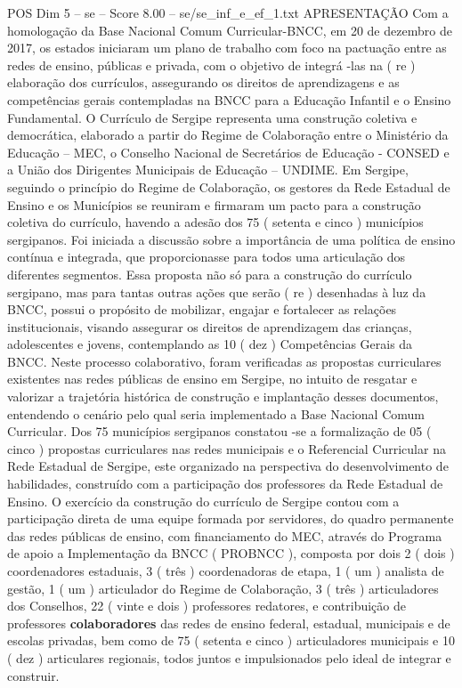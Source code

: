 \begin{textsample}{POS Dim 5 – se – Score 8.00 – se/se\_inf\_e\_ef\_1.txt}  \label{ex:f5_pos_131}
APRESENTAÇÃO Com a homologação da Base Nacional Comum Curricular-BNCC, em 20 de dezembro de 2017, os estados iniciaram um plano de trabalho com foco na pactuação entre as redes de ensino, públicas e privada, com o objetivo de integrá -las na ( re ) elaboração dos currículos, assegurando os direitos de aprendizagens e as competências gerais contempladas na BNCC para a Educação Infantil e o Ensino Fundamental.
O Currículo de Sergipe representa uma construção coletiva e democrática, elaborado a partir do Regime de Colaboração entre o Ministério da Educação – MEC, o Conselho Nacional de Secretários de Educação - CONSED e a União dos Dirigentes Municipais de Educação – UNDIME.
Em Sergipe, seguindo o princípio do Regime de Colaboração, os gestores da Rede Estadual de Ensino e os Municípios se reuniram e firmaram um pacto para a construção coletiva do currículo, havendo a adesão dos 75 ( setenta e cinco ) municípios sergipanos.
Foi iniciada a discussão sobre a importância de uma política de ensino contínua e integrada, que proporcionasse para todos uma articulação dos diferentes segmentos.
Essa proposta não só para a construção do currículo sergipano, mas para tantas outras ações que serão ( re ) desenhadas à luz da BNCC, possui o propósito de mobilizar, engajar e fortalecer as relações institucionais, visando assegurar os direitos de aprendizagem das crianças, adolescentes e jovens, contemplando as 10 ( dez ) Competências Gerais da BNCC.
Neste processo colaborativo, foram verificadas as propostas curriculares existentes nas redes públicas de ensino em Sergipe, no intuito de resgatar e valorizar a trajetória histórica de construção e implantação desses documentos, entendendo o cenário pelo qual seria implementado a Base Nacional Comum Curricular.
Dos 75 municípios sergipanos constatou -se a formalização de 05 ( cinco ) propostas curriculares nas redes municipais e o Referencial Curricular na Rede Estadual de Sergipe, este organizado na perspectiva do desenvolvimento de habilidades, construído com a participação dos professores da Rede Estadual de Ensino.
O exercício da construção do currículo de Sergipe contou com a participação direta de uma equipe formada por servidores, do quadro permanente das redes públicas de ensino, com financiamento do MEC, através do Programa de apoio a Implementação da BNCC ( PROBNCC ), composta por dois 2 ( dois ) coordenadores estaduais, 3 ( três ) coordenadoras de etapa, 1 ( um ) analista de gestão, 1 ( um ) articulador do Regime de Colaboração, 3 ( três ) articuladores dos Conselhos, 22 ( vinte e dois ) professores redatores, e contribuição de professores \textbf{colaboradores} das redes de ensino federal, estadual, municipais e de escolas privadas, bem como de 75 ( setenta e cinco ) articuladores municipais e 10 ( dez ) articulares regionais, todos juntos e impulsionados pelo ideal de integrar e construir.

\end{textsample}

